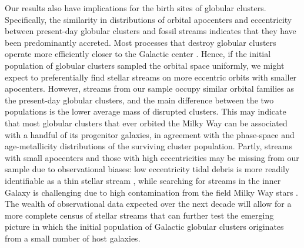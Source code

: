 \documentclass[twocolumn]{aastex63}
\begin{document}
Our results also have implications for the birth sites of globular clusters.
Specifically, the similarity in distributions of orbital apocenters and eccentricity between present-day globular clusters and fossil streams indicates that they have been predominantly accreted.
Most processes that destroy globular clusters operate more efficiently closer to the Galactic center \citep[e.g.,][]{gnedin:1997}.
Hence, if the initial population of globular clusters sampled the orbital space uniformly, we might expect to preferentially find stellar streams on more eccentric orbits with smaller apocenters.
However, streams from our sample occupy similar orbital families as the present-day globular clusters, and the main difference between the two populations is the lower average mass of disrupted clusters.
This may indicate that most globular clusters that ever orbited the Milky Way can be associated with a handful of its progenitor galaxies, in agreement with the phase-space \citep{massari:2019} and age-metallicity \citep{kruijssen19e,kruijssen20} distributions of the surviving cluster population.
Partly, streams with small apocenters and those with high eccentricities may be missing from our sample due to observational biases: low eccentricity tidal debris is more readily identifiable as a thin stellar stream \citep{hendel:2015}, while searching for streams in the inner Galaxy is challenging due to high contamination from the field Milky Way stars \citep[e.g.,][]{ibata:2019}.
The wealth of observational data expected over the next decade will allow for a more complete census of stellar streams that can further test the emerging picture in which the initial population of Galactic globular clusters originates from a small number of host galaxies.
\end{document}
